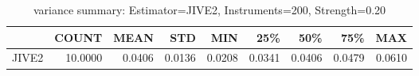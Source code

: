 \begin{table}[ht]
\centering
\caption{variance summary: Estimator=JIVE2, Instruments=200, Strength=0.20}
\begin{tabular}{lrrrrrrrr}
\toprule
 & COUNT & MEAN & STD & MIN & 25\% & 50\% & 75\% & MAX \\
\midrule
JIVE2 & 10.0000 & 0.0406 & 0.0136 & 0.0208 & 0.0341 & 0.0406 & 0.0479 & 0.0610 \\
\bottomrule
\end{tabular}
\end{table}
